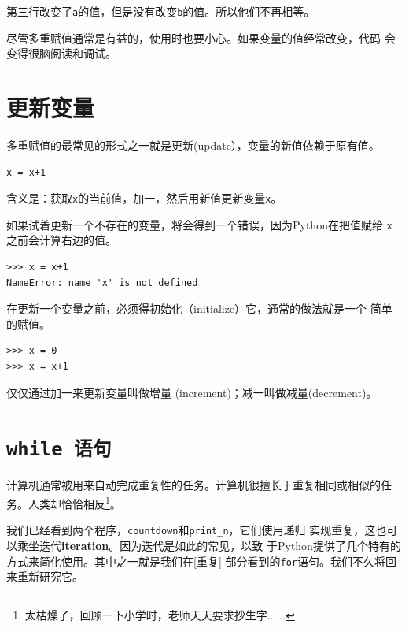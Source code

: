 第三行改变了{\tt a}的值，但是没有改变{\tt b}的值。所以他们不再相等。

尽管多重赋值通常是有益的，使用时也要小心。如果变量的值经常改变，代码
会变得很脑阅读和调试。

\section{更新变量}
\label{update}


多重赋值的最常见的形式之一就是更新(update），变量的新值依赖于原有值。

\beforeverb
\begin{verbatim}
x = x+1
\end{verbatim}
\afterverb

含义是：获取{\tt x}的当前值，加一，然后用新值更新变量{\tt x}。

如果试着更新一个不存在的变量，将会得到一个错误，因为Python在把值赋给
{\tt x}之前会计算右边的值。

\beforeverb
\begin{verbatim}
>>> x = x+1
NameError: name 'x' is not defined
\end{verbatim}
\afterverb
%

在更新一个变量之前，必须得初始化（initialize）它，通常的做法就是一个
简单的赋值。


\beforeverb
\begin{verbatim}
>>> x = 0
>>> x = x+1
\end{verbatim}
\afterverb
%

仅仅通过加一来更新变量叫做增量 (increment)；减一叫做减量(decrement)。


\section{{\tt while 语句}}


计算机通常被用来自动完成重复性的任务。计算机很擅长于重复相同或相似的任务。人类却恰恰相反\footnote{太枯燥了，回顾一下小学时，老师天天要求抄生字......}。

我们已经看到两个程序，{\tt countdown}和\verb"print_n"，它们使用递归
实现重复，这也可以乘坐迭代{\bf iteration}。因为迭代是如此的常见，以致
于Python提供了几个特有的方式来简化使用。其中之一就是我们在\ref{重复}
部分看到的{\tt for}语句。我们不久将回来重新研究它。\\

